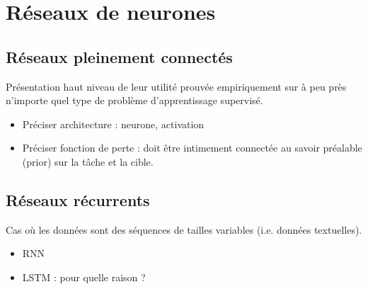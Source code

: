 \section{Réseaux de neurones}

\subsection{Réseaux pleinement connectés}

Présentation haut niveau de leur utilité prouvée empiriquement
sur à peu près n'importe quel type de problème d'apprentissage
supervisé.
\begin{itemize}
    \item Préciser architecture : neurone, activation
    \item Préciser fonction de perte : doit être intimement connectée
          au savoir préalable (prior) sur la tâche et la cible.
\end{itemize}

\subsection{Réseaux récurrents}

Cas où les données sont des séquences de tailles variables (i.e. données
textuelles).

\begin{itemize}
    \item RNN
    \item LSTM : pour quelle raison ?
\end{itemize}